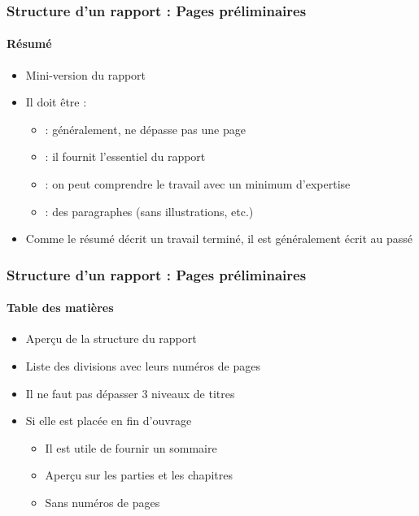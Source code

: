 \documentclass[xcolor=table]{beamer}
\begin{document}
\begin{frame}
\frametitle{Structure d'un rapport : Pages préliminaires}
\framesubtitle{Résumé}

\begin{minipage}{0.60\textwidth}
	\begin{itemize}
		\item Mini-version du rapport
		\item Il doit être :
		\begin{itemize}
			\item {} : généralement, ne dépasse pas une page
			\item {} : il fournit l'essentiel du rapport
			\item {} : on peut comprendre le travail avec un minimum d'expertise
			\item {} : des paragraphes (sans illustrations, etc.)
		\end{itemize}
		\item Comme le résumé décrit un travail terminé, il est généralement écrit au passé
	\end{itemize}
\end{minipage}
\begin{minipage}{0.38\textwidth}
\end{minipage}

\end{frame}

\begin{frame}
\frametitle{Structure d'un rapport : Pages préliminaires}
\framesubtitle{Table des matières}

\begin{minipage}{0.60\textwidth}
	\begin{itemize}
		\item Aperçu de la structure du rapport
		\item Liste des divisions avec leurs numéros de pages 
		\item Il ne faut pas dépasser 3 niveaux de titres
		\item Si elle est placée en fin d'ouvrage
		\begin{itemize}
			\item Il est utile de fournir un sommaire
			\item Aperçu sur les parties et les chapitres
			\item Sans numéros de pages
		\end{itemize}
	\end{itemize}
\end{minipage}
\begin{minipage}{0.38\textwidth}
\end{minipage}

\end{frame}
\end{document}
